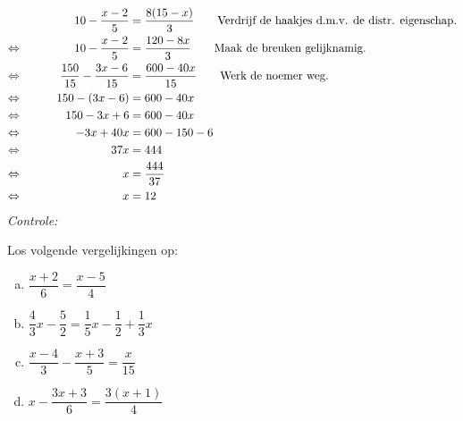 \documentclass[12pt]{article}
\begin{document}
\begin{voorbeeld}
\begin{alignat*}{2}
     && 10 - \dfrac{x-2}{5} &= \dfrac{8(15-x)}{3} \qquad\text{Verdrijf de haakjes d.m.v. de distr. eigenschap.}\\
\Leftrightarrow\mkern40mu && 10 - \dfrac{x-2}{5} &= \dfrac{120-8x}{3} \qquad\text{Maak de breuken gelijknamig.}\\
\Leftrightarrow\mkern40mu && \dfrac{150}{15} - \dfrac{3x-6}{15} &= \dfrac{600-40x}{15}	\qquad\text{Werk de noemer weg.}\\
\Leftrightarrow\mkern40mu && 150 - (3x -6) &= 600 - 40x\\
\Leftrightarrow\mkern40mu && 150 - 3x + 6	&= 600 - 40x\\
\Leftrightarrow\mkern40mu && - 3x + 40x	&= 600 - 150 - 6\\
\Leftrightarrow\mkern40mu && 37x	&= 444\\
\Leftrightarrow\mkern40mu && x	&= \dfrac{444}{37}\\
\Leftrightarrow\mkern40mu && x	&= 12
\end{alignat*}
{\em Controle: }\\
\end{voorbeeld}

\begin{exercise}
Los volgende vergelijkingen op:
\begin{enumerate}[(a)]
  \item $\dfrac{x+2}{6}=\dfrac{x-5}{4}$
  \item $\dfrac{4}{3}x-\dfrac{5}{2}=\dfrac{1}{5}x-\dfrac{1}{2}+\dfrac{1}{3}x$
  \item $\dfrac{x-4}{3}-\dfrac{x+3}{5}=\dfrac{x}{15}$
  \item $x-\dfrac{3x+3}{6}=\dfrac{3(x+1)}{4}$
\end{enumerate}
\end{exercise}
\end{document}

